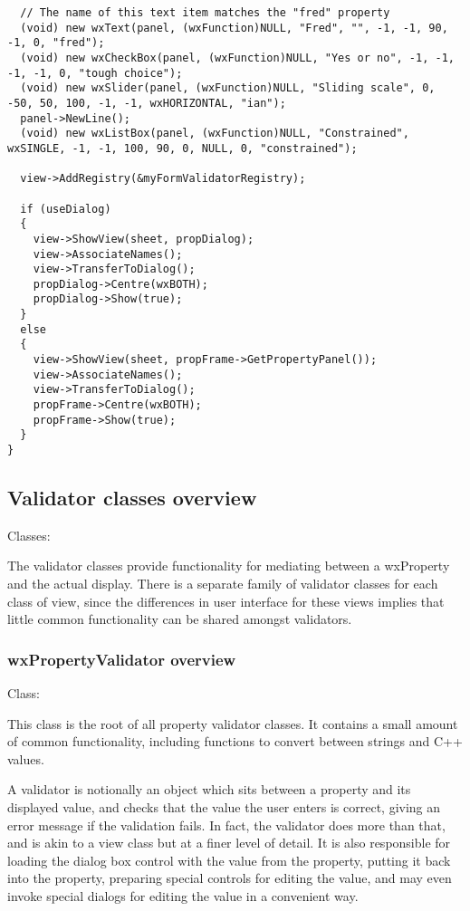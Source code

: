 \begin{verbatim}
  // The name of this text item matches the "fred" property
  (void) new wxText(panel, (wxFunction)NULL, "Fred", "", -1, -1, 90, -1, 0, "fred");
  (void) new wxCheckBox(panel, (wxFunction)NULL, "Yes or no", -1, -1, -1, -1, 0, "tough choice");
  (void) new wxSlider(panel, (wxFunction)NULL, "Sliding scale", 0, -50, 50, 100, -1, -1, wxHORIZONTAL, "ian");
  panel->NewLine();
  (void) new wxListBox(panel, (wxFunction)NULL, "Constrained", wxSINGLE, -1, -1, 100, 90, 0, NULL, 0, "constrained");

  view->AddRegistry(&myFormValidatorRegistry);

  if (useDialog)
  {
    view->ShowView(sheet, propDialog);
    view->AssociateNames();
    view->TransferToDialog();
    propDialog->Centre(wxBOTH);
    propDialog->Show(true);
  }
  else
  {
    view->ShowView(sheet, propFrame->GetPropertyPanel());
    view->AssociateNames();
    view->TransferToDialog();
    propFrame->Centre(wxBOTH);
    propFrame->Show(true);
  }
}
\end{verbatim}

\subsection{Validator classes overview}\label{proplistvalidatoroverview}

Classes: 

The validator classes provide functionality for mediating between a wxProperty and
the actual display. There is a separate family of validator classes for each
class of view, since the differences in user interface for these views implies
that little common functionality can be shared amongst validators.



\subsubsection{wxPropertyValidator overview}\label{wxpropertyvalidatoroverview}

Class: 

This class is the root of all property validator classes. It contains a small
amount of common functionality, including functions to convert between
strings and C++ values.

A validator is notionally an object which sits between a property and its displayed
value, and checks that the value the user enters is correct, giving an error message
if the validation fails. In fact, the validator does more than that, and is akin to
a view class but at a finer level of detail. It is also responsible for
loading the dialog box control with the value from the property, putting it back
into the property, preparing special controls for editing the value, and
may even invoke special dialogs for editing the value in a convenient way.


